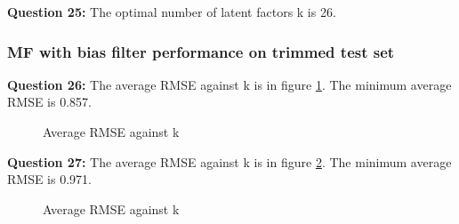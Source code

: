 \documentclass{article}
\begin{document}
\bigbreak \textbf{Question 25:}
The optimal number of latent factors k is 26.

\subsubsection{MF with bias filter performance on trimmed test set}

\bigbreak \textbf{Question 26:}
The average RMSE against k is in figure \ref{Q26}. The minimum average RMSE is 0.857.

\begin{figure}
\centering
{}
\caption{Average RMSE against k} \label{Q26}
\end{figure}


\bigbreak \textbf{Question 27:}
The average RMSE against k is in figure \ref{Q27}. The minimum average RMSE is 0.971.

\begin{figure}
\centering
{}
\caption{Average RMSE against k} \label{Q27}
\end{figure}
\end{document}
